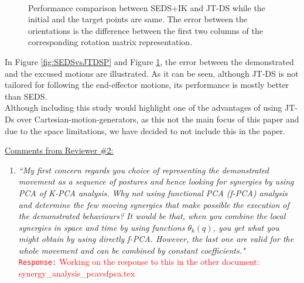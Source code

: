 \documentclass[10pt,stdletter,dateno]{newlfm}
\begin{document}
\begin{newlfm}
\begin{enumerate}
{\begin{figure}[t]
\begin{subfigure}[t]{0.63\textwidth}
			\caption{ }	
			\label{fig:SEDSvsJTDSO}
		\end{subfigure}\\
	\caption{Performance comparison between SEDS+IK and JT-DS while the initial and the target points are same. The error between the orientations is the difference between the first two columns of the corresponding rotation matrix representation.}
	\label{fig:SEDSvsJTDS}
\end{figure}
In Figure \ref{fig:SEDSvsJTDSP} and Figure \ref{fig:SEDSvsJTDSO}, the error between the demonstrated and the excused motions are illustrated. As it can be seen, although JT-DS is not tailored for following the end-effector motions, its performance is mostly better than SEDS.\\
Although including this study would highlight one of the advantages of using JT-Ds over Cartesian-motion-generators, as this not the main focus of this paper and due to the space limitations, we have decided to not include this in the paper.}
\end{enumerate}





\underline{Comments from Reviewer \#2:}
\begin{enumerate}
\item \textit{``My first concern regards you choice of representing the demonstrated
movement as a sequence of postures and hence looking for synergies by
using PCA of K-PCA analysis. Why not using functional PCA (f-PCA)
analysis and determine the few moving synergies that make possible the
execution of the demonstrated behaviours? It would be that, when you
combine the local synergies in space and time by using functions
$\theta_k(q)$, you get what you might obtain by using directly f-PCA.
However, the last one are valid for the whole movement and can be
combined by constant coefficients."}\\
\textcolor{red}{\texttt{Response:} \small Working on the response to this in the other document: synergy\_analysis\_pcavsfpca.tex}\\


\end{enumerate}
\end{newlfm}
\end{document}
